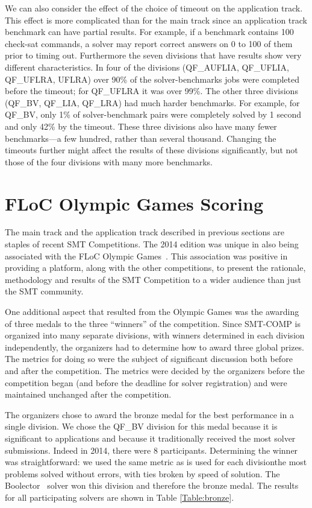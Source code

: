 \documentclass[twoside,11pt]{article}
\begin{document}
We can also consider the effect of the choice of timeout on the application track. This effect is more complicated than for the main track since an application track benchmark can have partial results. For example, if a benchmark contains 100 check-sat commands, a solver may report correct answers on 0 to 100 of them prior to timing out. Furthermore the seven divisions that have results show very different characteristics. In four of the divisions (QF\_AUFLIA, QF\_UFLIA, QF\_UFLRA, UFLRA) over 90\% of the solver-benchmarks jobs were completed before the timeout; for QF\_UFLRA it was over 99\%. The other three divisions (QF\_BV, QF\_LIA, QF\_LRA) had much harder benchmarks. For example, for QF\_BV, only 1\% of solver-benchmark pairs were completely solved by 1 second and only 42\% by the timeout.  These three divisions also have many fewer benchmarks---a few hundred, rather than several thousand. Changing the timeouts further might affect the results of these divisions significantly, but not those of the four divisions with many more benchmarks.

\section{FLoC Olympic Games Scoring}
\label{sec:floc}

The main track and the application track described in previous sections are staples of recent SMT Competitions. The 2014 edition was unique in also being associated with the FLoC Olympic Games~\cite{FLoCGames}.
This association was positive in providing a platform, along with the other competitions, to present the
rationale, methodology and results of the SMT Competition to a wider audience than just the SMT community.

One additional aspect that resulted from the Olympic Games was the awarding of three medals to the three ``winners'' of the competition. Since SMT-COMP is organized into many separate divisions, with winners determined in each division independently, the organizers had to determine how to award three global prizes.
The metrics for doing so were the subject of significant discussion both before and after the competition.
The metrics were decided by the organizers before the competition began (and before the deadline for solver registration) and were maintained unchanged after the competition.

The organizers chose to award the bronze medal for the best performance in a single division. We chose  the QF\_BV division for this medal because it is significant to applications and because it traditionally received the most solver submissions. Indeed in 2014, there were 8 participants. Determining the winner was straightforward: we used the same metric as is used for each division\textemdash the most problems solved without errors, with ties broken by speed of solution. The Boolector~\cite{boolector} solver won this division and therefore the bronze medal. The results for all participating solvers are shown in Table \ref{Table:bronze}.
\end{document}
